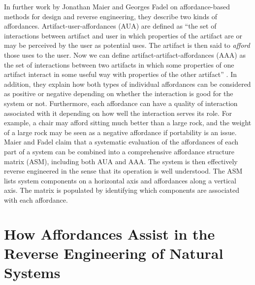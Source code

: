 In further work by Jonathan Maier and Georges Fadel on affordance-based
methods for design and reverse engineering, they describe two kinds of
affordances. Artifact-user-affordances (AUA) are defined as “the set of
interactions between artifact and user in which properties of the
artifact are or may be perceived by the user as potential uses. The
artifact is then said to \textit{afford} those uses to the user. Now we
can define artifact-artifact-affordances (AAA) as the set of
interactions between two artifacts in which some properties of one
artifact interact in some useful way with properties of the other
artifact” \citep{maierfadel2003}. In addition, they explain how both types
of individual affordances can be considered as positive or negative
depending on whether the interaction is good for the system or not.
Furthermore, each affordance can have a quality of interaction
associated with it depending on how well the interaction serves its
role. For example, a chair may afford sitting much better than a large
rock, and the weight of a large rock may be seen as a negative
affordance if portability is an issue. Maier and Fadel claim that a
systematic evaluation of the affordances of each part of a system can
be combined into a comprehensive affordance structure matrix (ASM),
including both AUA and AAA.\citep{maieretal2003, maieretal2008} The system is then
effectively reverse engineered in the sense that its operation is well
understood. The ASM lists system components on a horizontal axis and
affordances along a vertical axis. The matrix is populated by
identifying which components are associated with each affordance.

\section{How Affordances Assist in the Reverse Engineering of Natural Systems}

